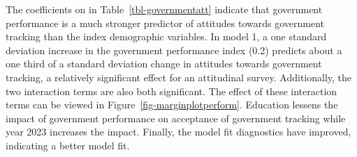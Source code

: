 \documentclass[
  letterpaper,
  DIV=11,
  numbers=noendperiod]{scrartcl}
\begin{document}
The coefficients on in Table~\ref{tbl-governmentatt} indicate that
government performance is a much stronger predictor of attitudes towards
government tracking than the index demographic variables. In model 1, a
one standard deviation increase in the government performance index
(0.2) predicts about a one third of a standard deviation change in
attitudes towards government tracking, a relatively significant effect
for an attitudinal survey. Additionally, the two interaction terms are
also both significant. The effect of these interaction terms can be
viewed in Figure~\ref{fig-marginplotperform}. Education lessens the
impact of government performance on acceptance of government tracking
while year 2023 increases the impact. Finally, the model fit diagnostics
have improved, indicating a better model fit.

\begin{figure}

\end{figure}
\end{document}
